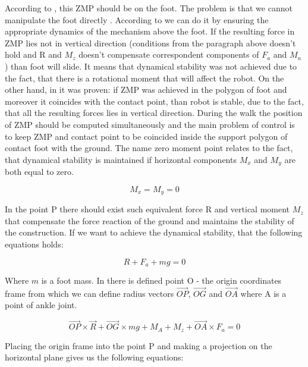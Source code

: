 \documentclass[12pt,a4paper]{report}
\begin{document}
		According to \cite{kajita2003biped}, this ZMP should be on the foot. The problem is that we cannot manipulate the foot directly \cite{mitobe2000control}. According to \cite{vukobratovic2004zero} we can do it by ensuring the appropriate dynamics of the mechanism above the foot. If the resulting force in ZMP lies not in vertical direction (conditions from the paragraph above doesn't hold and R and $M_z$ doesn't compensate correspondent components of $F_a$ and $M_a$) than foot will slide. It means that dynamical stability was not achieved due to the fact, that there is a rotational moment that will affect the robot. On the other hand, in \cite{sardain2004forces} it was proven: if ZMP was achieved in the polygon of foot and moreover it coincides with the contact point, than robot is stable, due to the fact, that all the resulting forces lies in vertical direction. During the walk the position of ZMP should be computed simultaneously and the main problem of control is to keep ZMP and contact point to be coincided inside the support polygon of contact foot with the ground.
		The name zero moment point relates to the fact, that dynamical stability is maintained if horizontal components $M_x$ and $M_y$ are both equal to zero.
	
		\begin{equation}\label{eq:ZMP1}
			M_x = M_y = 0
		\end{equation}

		In the point P there should exist such equivalent force R and vertical moment $M_z$ that compensate the force reaction of the ground and maintains the stability of the construction. If we want to achieve the dynamical stability, that the following equations holds:

		\begin{equation}\label{eq:ZMP2}
			R + F_a + mg = 0
		\end{equation}

		Where $m$ is a foot mass. In \cite{vukobratovic2004zero} there is defined  point O - the origin coordinates frame from which we can define radius vectors $\vec{OP}$, $\vec{OG}$ and $\vec{OA}$ where A is a point of ankle joint.

		\begin{equation}\label{eq:ZMP3}
			\vec{OP} \times \vec{R} + \vec{OG} \times mg + M_A + M_z + \vec{OA} \times F_a = 0
		\end{equation}

		Placing the origin frame into the point P and making a projection on the horizontal plane gives us the following equations: 
\end{document}
